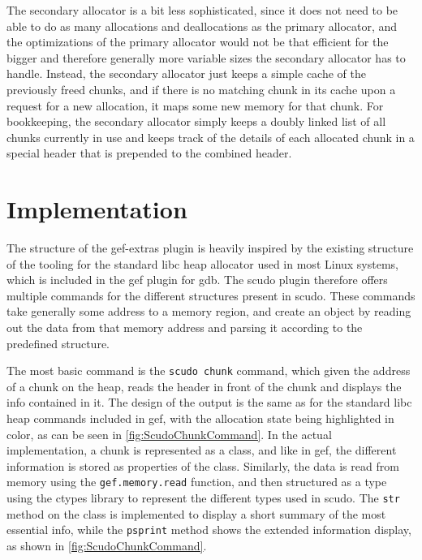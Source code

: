 \documentclass[a4paper,11pt,oneside]{report}
\begin{document}
The secondary allocator is a bit less sophisticated, since it does not need to
be able to do as many allocations and deallocations as the primary allocator,
and the optimizations of the primary allocator would not be that efficient for
the bigger and therefore generally more variable sizes the secondary allocator
has to handle. Instead, the secondary allocator just keeps a simple cache of
the previously freed chunks, and if there is no matching chunk in its cache
upon a request for a new allocation, it maps some new memory for that chunk.
For bookkeeping, the secondary allocator simply keeps a doubly linked list of
all chunks currently in use and keeps track of the details of each allocated
chunk in a special header that is prepended to the combined header.


\chapter{Implementation}

The structure of the gef-extras plugin is heavily inspired by the existing
structure of the tooling for the standard libc heap allocator used in most
Linux systems, which is included in the gef plugin for gdb. The scudo plugin
therefore offers multiple commands for the different structures present in
scudo. These commands take generally some address to a memory region, and
create an object by reading out the data from that memory address and parsing
it according to the predefined structure.

The most basic command is the \verb|scudo chunk| command, which given the address
of a chunk on the heap, reads the header in front of the chunk and displays
the info contained in it. The design of the output is the same as for the
standard libc heap commands included in gef, with the allocation state being
highlighted in color, as can be seen in \autoref{fig:ScudoChunkCommand}.
In the actual implementation, a chunk is represented as a class, and like in
gef, the different information is stored as properties of the class. Similarly,
the data is read from memory using the \verb|gef.memory.read| function, and then
structured as a type using the ctypes library to represent the different types
used in scudo. The \verb|str| method on the class is implemented to display a short
summary of the most essential info, while the \verb|psprint| method shows the
extended information display, as shown in \autoref{fig:ScudoChunkCommand}.
\end{document}

